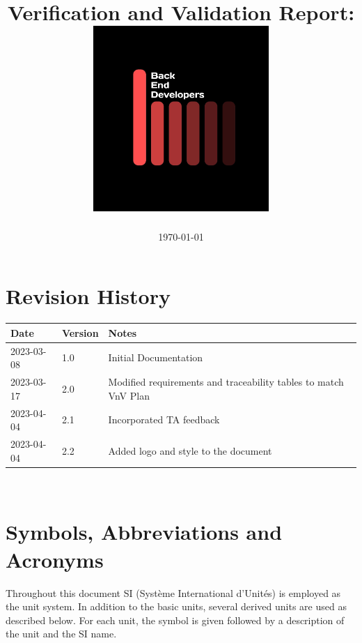 \documentclass[12pt, titlepage]{article}
\begin{document}
\title{\textbf{Verification and Validation Report: \progname} \\ \vspace{2cm} \includegraphics[width=0.5\textwidth]{../logo.jpg}}
 \pagecolor{black}\afterpage{\nopagecolor}
\author{\authname}
\date{\today}

\color{white}\maketitle
\color{black}

\section{Revision History}

\begin{tabularx}{\textwidth}{p{2.2cm}p{1.4cm}X}
  \toprule {\bf Date} & {\bf Version} & {\bf Notes} \\
  \midrule
  2023-03-08              & 1.0           & Initial Documentation       \\
  2023-03-17		&2.0		& Modified requirements and traceability tables to match VnV Plan \\
2023-04-04 & 2.1 & Incorporated TA feedback \\
2023-04-04 & 2.2 & Added logo and style to the document \\
  \bottomrule
\end{tabularx}

~\newpage

\section{Symbols, Abbreviations and Acronyms}


Throughout this document SI (Syst\`{e}me International d'Unit\'{e}s) is employed
as the unit system.  In addition to the basic units, several derived units are
used as described below.  For each unit, the symbol is given followed by a
description of the unit and the SI name.
~\newline
\end{document}

